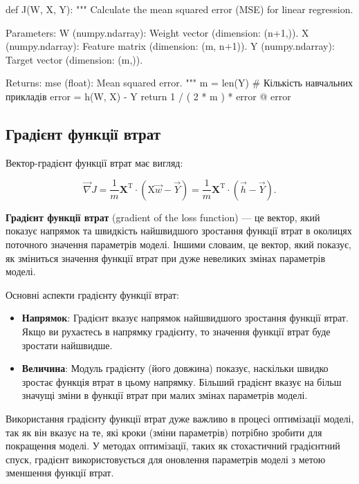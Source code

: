 \documentclass[]{article}
\newcounter{pythoncode}
\begin{document}
\begin{pythoncode}
def J(W, X, Y):
    """
    Calculate the mean squared error (MSE) for linear regression.

    Parameters:
    W (numpy.ndarray): Weight vector (dimension: (n+1,)).
    X (numpy.ndarray): Feature matrix (dimension: (m, n+1)).
    Y (numpy.ndarray): Target vector (dimension: (m,)).

    Returns:
    mse (float): Mean squared error.
    """
    m = len(Y)  # Кількість навчальних прикладів
    error = h(W, X) - Y
    return 1 / ( 2 * m ) * error @ error
\end{pythoncode}

\subsection{Градієнт функції втрат}

Вектор-градієнт функції втрат має вигляд:

\[ \vec{\nabla} J = \frac1{m} \mathbf{X}^{\mathrm{T}} \cdot (\mathrm{X}\vec{w} - \vec{Y} )  = \frac1{m} \mathbf{X}^{\mathrm{T}} \cdot (\vec{h} - \vec{Y} ). \]

\textbf{Градієнт функції втрат} (gradient of the loss function) --- це
вектор, який показує напрямок та швидкість найшвидшого зростання функції
втрат в околицях поточного значення параметрів моделі. Іншими словаим,
це вектор, який показує, як зміниться значення функції втрат при дуже
невеликих змінах параметрів моделі.

Основні аспекти градієнту функції втрат:

\begin{itemize}
	\item
	      \textbf{Напрямок}: Градієнт вказує напрямок найшвидшого зростання
	      функції втрат. Якщо ви рухаєтесь в напрямку градієнту, то значення
	      функції втрат буде зростати найшвидше.
	\item
	      \textbf{Величина}: Модуль градієнту (його довжина) показує, наскільки
	      швидко зростає функція втрат в цьому напрямку. Більший градієнт вказує
	      на більш значущі зміни в функції втрат при малих змінах параметрів
	      моделі.
\end{itemize}

Використання градієнту функції втрат дуже важливо в процесі оптимізації
моделі, так як він вказує на те, які кроки (зміни параметрів) потрібно
зробити для покращення моделі. У методах оптимізації, таких як
стохастичний градієнтний спуск, градієнт використовується для оновлення
параметрів моделі з метою зменшення функції втрат.
\end{document}
